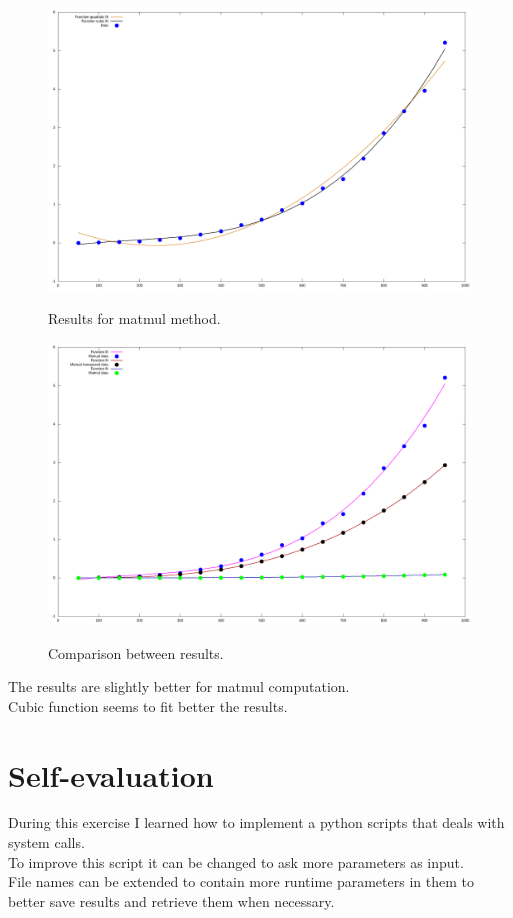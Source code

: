 \documentclass[12pt, a4paper, notitlepage]{report}
\begin{document}
\begin{figure}[H]
	\centering
	{\includegraphics[scale=0.3]{Fit_F.png}} 
	\caption{Results for matmul method.}
	\label{figure_lambdas}
\end{figure}

\begin{figure}[H]
	\centering
	{\includegraphics[scale=0.3]{Fit_comp.png}} 
	\caption{Comparison between results.}
	\label{figure_lambdas}
\end{figure}

The results are slightly better for matmul computation.\\
Cubic function seems to fit better the results.

\section*{Self-evaluation}
During this exercise I learned how to implement a python scripts that deals with system calls.\\
To improve this script it can be changed to ask more parameters as input.\\
File names can be extended to contain more runtime parameters in them to better save results and retrieve them when necessary.
\end{document}
